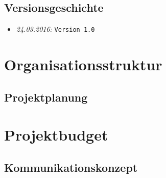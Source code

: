 \documentclass{fhnwreport/fhnwreport}
\begin{document}


\tableofcontents
\vspace{130mm}
\subsection*{Versionsgeschichte}
\begin{itemize}
    \item[]
        \emph{24.03.2016:} \texttt{Version 1.0}
\end{itemize}
\clearpage

\section{Organisationsstruktur}
\label{sec:organisatsionsstruktur}


\clearpage
\begin{landscape}
\section{Projektplanung}
\label{sec:projektplanung}

\end{landscape}

\clearpage
\section{Projektbudget}
\label{sec:Projektbudget}


\clearpage
\begin{landscape}
\section{Kommunikationskonzept}
\label{sec:kommunikationskonzept}

\end{landscape}
\end{document}
